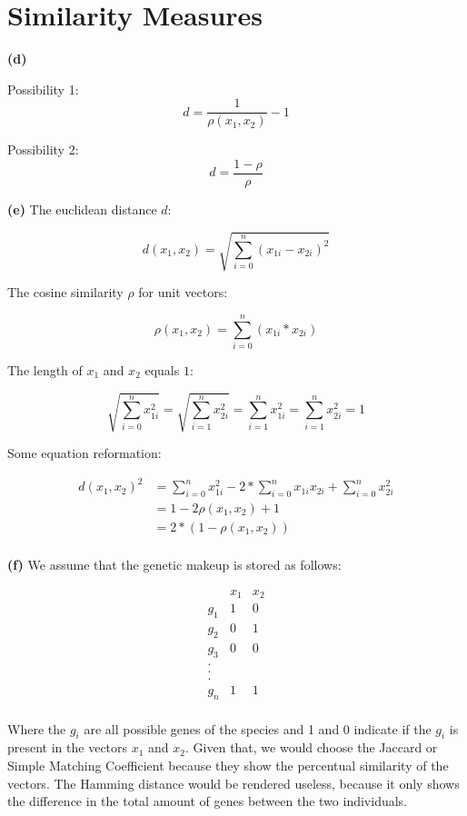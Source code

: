 





\setcounter{section}{1}
\section{Similarity Measures}

\textbf{(d)}

Possibility 1: 
$$
d = \frac{1}{\rho(x_1,x_2)} - 1
$$

Possibility 2: 
$$
d = \frac{1-\rho}{\rho}
$$

\textbf{(e)} The euclidean distance $ d $:

$$
d(x_1, x_2) = \sqrt{\sum_{i=0}^{n}(x_{1i} - x_{2i})^2}
$$

The cosine similarity $ \rho $ for unit vectors:

$$
\rho(x_1, x_2) = \sum_{i=0}^{n}(x_{1i} * x_{2i})
$$

The length of $ x_1 $ and $ x_2 $ equals $ 1 $:

$$
\sqrt{\sum_{i=0}^{n}x_{1i}^2} = \sqrt{\sum_{i=1}^{n}x_{2i}^2} = \sum_{i=1}^{n}x_{1i}^2 = \sum_{i=1}^{n}x_{2i}^2 = 1
$$

Some equation reformation:

$$
\begin{aligned}
d(x_1, x_2)^2 &= \sum_{i=0}^{n}x_{1i}^2 - 2 * \sum_{i=0}^{n}x_{1i}x_{2i} + \sum_{i=0}^{n}x_{2i}^2 \\
 &= 1 - 2\rho(x_1, x_2) + 1\\
 &= 2 * (1-\rho(x_1, x_2))\\
\end{aligned}
$$

\pagebreak
\textbf{(f)} We assume that the genetic makeup is stored as follows:

$$
\begin{array}{ccc}
     &   x_1 & x_2\\
    g_1 & 1 &  0\\
    g_2 & 0 &  1\\
    g_3 & 0 &  0\\
    . & &\\
    . & &\\
    . & &\\
    g_n & 1 &  1 \\
\end{array}
$$
    
Where the $g_i$ are all possible genes of the species and 1 and 0 indicate if 
the $g_i$ is present in the vectors $x_1$ and $x_2$. 
Given that, we would choose the Jaccard or Simple Matching Coefficient because 
they show the percentual similarity of the vectors. 
The Hamming distance would be rendered useless, because it only shows the 
difference in the total amount of genes between the two individuals.  

